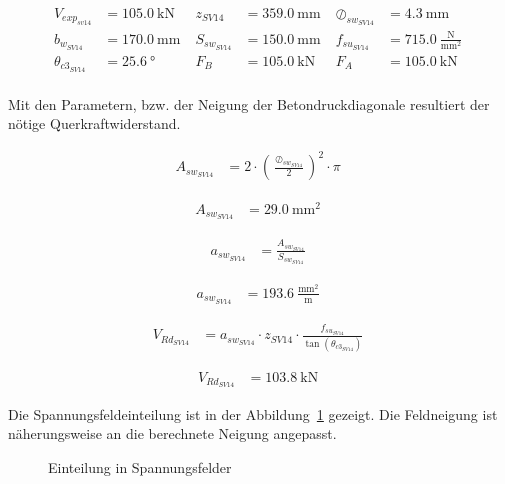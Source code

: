 \documentclass[
  11pt,
  letterpaper,
]{scrreprt}
\begin{document}
$$
\begin{aligned}
V_{exp_{sv14}} &= 105.0\ \mathrm{kN} \; 
 &z_{SV14} &= 359.0\ \mathrm{mm} \; 
 &\oslash_{sw_{SV14}} &= 4.3\ \mathrm{mm} \; 
\\[11pt]
 b_{w_{SV14}} &= 170.0\ \mathrm{mm} \; 
 &S_{sw_{SV14}} &= 150.0\ \mathrm{mm} \; 
 &f_{su_{SV14}} &= 715.0\ \frac{\mathrm{N}}{\mathrm{mm}^{2}} \; 
\\[11pt]
 \theta_{c3_{SV14}} &= 25.6\ \mathrm{°} \; 
 &F_{B} &= 105.0\ \mathrm{kN} \; 
 &F_{A} &= 105.0\ \mathrm{kN} \; 
\\[11pt]
\end{aligned}
$$

Mit den Parametern, bzw. der Neigung der Betondruckdiagonale resultiert
der nötige Querkraftwiderstand.

$$
\begin{aligned}
A_{sw_{SV14}} &= 2 \cdot \left( \frac{ \oslash_{sw_{SV14}} }{ 2 } \right) ^{ 2 } \cdot \pi \; 
\end{aligned}
$$

$$
\begin{aligned}
A_{sw_{SV14}} &= 29.0\ \mathrm{mm}^{2} \;
\end{aligned}
$$

$$
\begin{aligned}
a_{sw_{SV14}} &= \frac{ A_{sw_{SV14}} }{ S_{sw_{SV14}} } \; 
\end{aligned}
$$

$$
\begin{aligned}
a_{sw_{SV14}} &= 193.6\ \frac{\mathrm{mm}^{2}}{\mathrm{m}} \;
\end{aligned}
$$

$$
\begin{aligned}
V_{Rd_{SV14}} &= a_{sw_{SV14}} \cdot z_{SV14} \cdot \frac{ f_{su_{SV14}} }{ \tan \left( \theta_{c3_{SV14}} \right) } \; 
\end{aligned}
$$

$$
\begin{aligned}
V_{Rd_{SV14}} &= 103.8\ \mathrm{kN} \;
\end{aligned}
$$

Die Spannungsfeldeinteilung ist in der
Abbildung~\ref{fig-spannungsfelder_sv14} gezeigt. Die Feldneigung ist
näherungsweise an die berechnete Neigung angepasst.

\begin{figure}[H]


\caption{\label{fig-spannungsfelder_sv14}Einteilung in Spannungsfelder}

\end{figure}%
\end{document}
